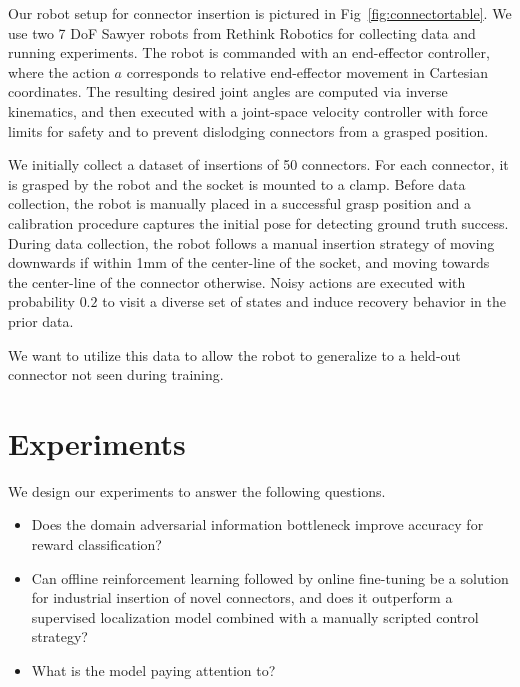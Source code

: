 \documentclass[letterpaper, 10 pt, conference, final]{ieeeconf}   %
\newcommand{\numconnectors}{50}
\begin{document}
Our robot setup for connector insertion is pictured in Fig~\ref{fig:connectortable}. We use two 7 DoF Sawyer robots from Rethink Robotics for collecting data and running experiments. The robot is commanded with an end-effector controller, where the action $a$ corresponds to relative end-effector movement in Cartesian coordinates. The resulting desired joint angles are computed via inverse kinematics, and then executed with a joint-space velocity controller with force limits for safety and to prevent dislodging connectors from a grasped position.

We initially collect a dataset of insertions of \numconnectors{} connectors. For each connector, it is grasped by the robot and the socket is mounted to a clamp. Before data collection, the robot is manually placed in a successful grasp position and a calibration procedure captures the initial pose for detecting ground truth success. During data collection, the robot follows a manual insertion strategy of moving downwards if within 1mm of the center-line of the socket, and moving towards the center-line of the connector otherwise. Noisy actions are executed with probability $0.2$ to visit a diverse set of states and induce recovery behavior in the prior data.

We want to utilize this data to allow the robot to generalize to a held-out connector not seen during training.


\section{Experiments}







We design our experiments to answer the following questions.
\begin{itemize}
    \item Does the domain adversarial information bottleneck improve accuracy for reward classification?
    \item Can offline reinforcement learning followed by online fine-tuning be a solution for industrial insertion of novel connectors, and does it outperform a supervised localization model combined with a manually scripted control strategy?
    \item What is the model paying attention to?
\end{itemize}
\end{document}
